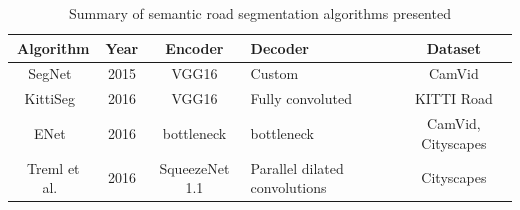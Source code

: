 \begin{table}[H]
	\renewcommand{\arraystretch}{1.3}
	\caption{Summary of semantic road segmentation algorithms presented}
	\label{tabsemantic}
	\centering
	\begin{tabularx}{\linewidth}{c c c >{\centering\arraybackslash}X c}
		\toprule
		           \bfseries Algorithm            & \bfseries Year & \bfseries Encoder & \bfseries Decoder             & \bfseries Dataset  \\ \midrule
		SegNet~\cite{badrinarayanan_segnet:_2017} & 2015           & VGG16             & Custom                        & CamVid             \\
		KittiSeg~\cite{teichmann_multinet:_2016}  & 2016           & VGG16             & Fully convoluted              & KITTI Road         \\
		      ENet~\cite{paszke_enet:_2016}       & 2016           & bottleneck        & bottleneck                    & CamVid, Cityscapes \\
		 Treml et al.~\cite{treml_speeding_2016}  & 2016           & SqueezeNet 1.1    & Parallel dilated convolutions & Cityscapes         \\ \bottomrule
	\end{tabularx}
\end{table}

